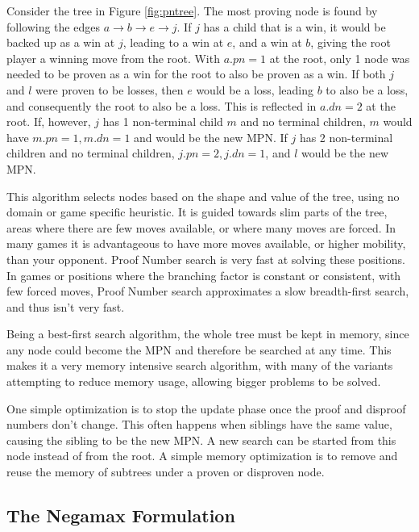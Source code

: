 Consider the tree in Figure \ref{fig:pntree}. The most proving node is found by following the edges $a \rightarrow b \rightarrow e \rightarrow j$. If $j$ has a child that is a win, it would be backed up as a win at $j$, leading to a win at $e$, and a win at $b$, giving the root player a winning move from the root. With $a.pn = 1$ at the root, only 1 node was needed to be proven as a win for the root to also be proven as a win. If both $j$ and $l$ were proven to be losses, then $e$ would be a loss, leading $b$ to also be a loss, and consequently the root to also be a loss. This is reflected in $a.dn = 2$ at the root. If, however, $j$ has 1 non-terminal child $m$ and no terminal children, $m$ would have $m.pn = 1, m.dn = 1$ and would be the new MPN. If $j$ has 2 non-terminal children and no terminal children, $j.pn = 2, j.dn = 1$, and $l$ would be the new MPN. 

This algorithm selects nodes based on the shape and value of the tree, using no domain or game specific heuristic. It is guided towards slim parts of the tree, areas where there are few moves available, or where many moves are forced. In many games it is advantageous to have more moves available, or higher mobility, than your opponent. Proof Number search is very fast at solving these positions. In games or positions where the branching factor is constant or consistent, with few forced moves, Proof Number search approximates a slow breadth-first search, and thus isn't very fast.

Being a best-first search algorithm, the whole tree must be kept in memory, since any node could become the MPN and therefore be searched at any time. This makes it a very memory intensive search algorithm, with many of the variants attempting to reduce memory usage, allowing bigger problems to be solved.

One simple optimization is to stop the update phase once the proof and disproof numbers don't change. This often happens when siblings have the same value, causing the sibling to be the new MPN. A new search can be started from this node instead of from the root. A simple memory optimization is to remove and reuse the memory of subtrees under a proven or disproven node.

\subsection{The Negamax Formulation} \label{sec:NegaPDS}


